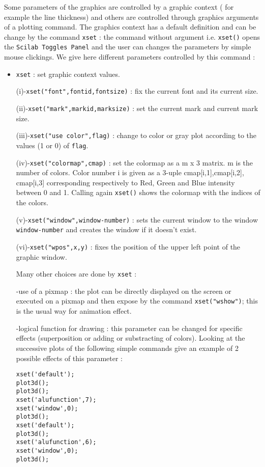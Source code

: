Some parameters of the graphics are controlled by a graphic context 
( for example the line thickness) and others are controlled through
graphics arguments of a plotting command.
The graphics context has a default definition and can be change by the
command {\tt xset} : the command without argument i.e. {\tt xset()}
opens the {\tt Scilab Toggles Panel} and the user can changes the
parameters by simple mouse clickings. We give here different
parameters controlled by this command :
%
\begin{itemize}
	\item  {\tt xset}		: set graphic context values.

(i)-{\tt xset("font",fontid,fontsize)} 	: fix the current font and 
its current size.

(ii)-{\tt xset("mark",markid,marksize)}	: set the current mark 
and current mark size.

(iii)-{\tt xset("use color",flag)} 	: change to color or gray plot according to 
the values (1 or 0) of {\tt flag}.

(iv)-{\tt xset("colormap",cmap)} 	: set the colormap as a m x 3
matrix. m is the number of colors.  Color number i is given as a
3-uple cmap[i,1],cmap[i,2], cmap[i,3] corresponding respectively to Red,
Green and Blue intensity between 0 and 1. Calling again {\tt xset()} 
shows the colormap with the indices of the colors.

(v)-{\tt xset("window",window-number)}	: sets the current window to the window \\
{\tt window-number} and creates the window if it doesn't exist.

(vi)-{\tt xset("wpos",x,y)}	: fixes the position of the upper left point of 
the graphic window.

Many other choices are done by {\tt xset} :
 
-use of a pixmap : the plot can be directly displayed on the screen or
executed on a pixmap and then expose by the command 
{\tt xset("wshow")}; this is the usual way for animation effect.

-logical function for drawing : this parameter can be changed for 
specific effects (superposition or adding or substracting of colors).
Looking at the successive plots of the following simple commands give
an example of 2 possible effects of this parameter :

\begin{verbatim}
xset('default');
plot3d();
plot3d();
xset('alufunction',7);
xset('window',0);
plot3d();
xset('default');
plot3d();
xset('alufunction',6);
xset('window',0);
plot3d();
\end{verbatim} 


\end{itemize}
